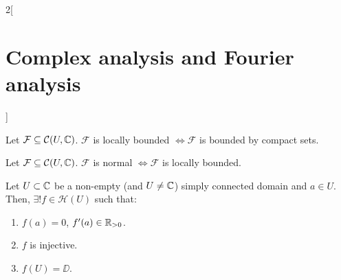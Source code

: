 \documentclass[../../../main.tex]{subfiles}
\begin{document}
\begin{multicols}{2}[\section{Complex analysis and Fourier analysis}]
\begin{lemma}
    Let $\mathcal{F}\subseteq \mathcal{C}(U,\mathbb{C})$. $\mathcal{F}$ is locally bounded $\iff \mathcal{F}$ is bounded by compact sets.
  \end{lemma}
  \begin{theorem}
    Let $\mathcal{F}\subseteq \mathcal{C}(U,\mathbb{C})$. $\mathcal{F}$ is normal $\iff \mathcal{F}$ is locally bounded.
  \end{theorem}
  \begin{theorem}
    Let $U\subset \mathbb{C}$ be a non-empty (and $U\ne\mathbb{C}$) simply connected domain and $a\in U$. Then, $\exists!f\in\mathcal{H}(U)$ such that:
    \begin{enumerate}
      \item $f(a)=0$, $f'(a)\in\mathbb{R}_{>0}$.
      \item $f$ is injective.
      \item $f(U)=\DD$.
    \end{enumerate}
  \end{theorem}
\end{multicols}
\end{document}

